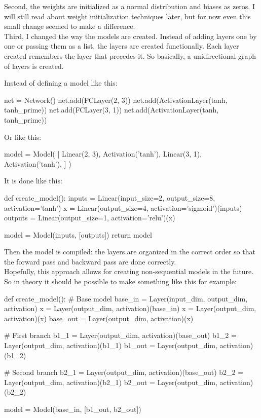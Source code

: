 \documentclass{article}
\begin{document}
Second, the weights are initialized as a normal distribution and biases as zeros. I will still read about weight initialization techniques later, but 
for now even this small change seemed to make a difference. \\

Third, I changed the way the models are created. Instead of adding layers one by one or passing them as a list, the layers are created functionally. Each layer created remembers 
the layer that precedes it. So basically, a unidirectional graph of layers is created.
\pagebreak

Instead of defining a model like this:
\begin{python}
    net = Network()
    net.add(FCLayer(2, 3))
    net.add(ActivationLayer(tanh, tanh_prime))
    net.add(FCLayer(3, 1))
    net.add(ActivationLayer(tanh, tanh_prime))
\end{python}

Or like this:
\begin{python}
    model = Model(
        [
            Linear(2, 3),
            Activation('tanh'),
            Linear(3, 1),
            Activation('tanh'),
        ]
    )
\end{python}

It is done like this:
\begin{python}
    def create_model():
        inputs = Linear(input_size=2, output_size=8, activation='tanh')
        x = Linear(output_size=4, activation='sigmoid')(inputs)
        outputs = Linear(output_size=1, activation='relu')(x)

        model = Model(inputs, [outputs])
        return model
\end{python}

Then the model is compiled: the layers are organized in the correct order so that 
the forward pass and backward pass are done correctly. \\

Hopefully, this approach allows for creating non-sequential models in the future. So in theory it should 
be possible to make something like this for example:
\begin{python}
    def create_model():
        # Base model
        base_in = Layer(input_dim, output_dim, activation)
        x = Layer(output_dim, activation)(base_in)
        x = Layer(output_dim, activation)(x)
        base_out = Layer(output_dim, activation)(x)

        # First branch
        b1_1 = Layer(output_dim, activation)(base_out)
        b1_2 = Layer(output_dim, activation)(b1_1)
        b1_out = Layer(output_dim, activation)(b1_2)

        # Second branch
        b2_1 = Layer(output_dim, activation)(base_out)
        b2_2 = Layer(output_dim, activation)(b2_1)
        b2_out = Layer(output_dim, activation)(b2_2)

        model = Model(base_in, [b1_out, b2_out])
\end{python}
\end{document}

